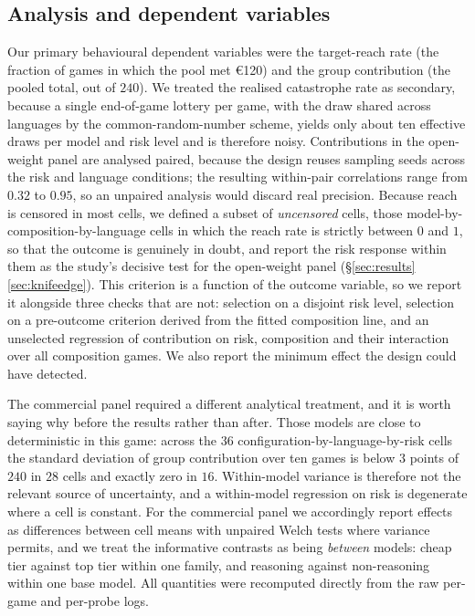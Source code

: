 \documentclass[openacc]{rsproca_new}
\begin{document}
\subsection{Analysis and dependent variables}
Our primary behavioural dependent variables were the target-reach rate (the fraction of games in which the pool met \euro{}120) and the group contribution (the pooled total, out of $240$). We treated the realised catastrophe rate as secondary, because a single end-of-game lottery per game, with the draw shared across languages by the common-random-number scheme, yields only about ten effective draws per model and risk level and is therefore noisy. Contributions in the open-weight panel are analysed paired, because the design reuses sampling seeds across the risk and language conditions; the resulting within-pair correlations range from $0.32$ to $0.95$, so an unpaired analysis would discard real precision. Because reach is censored in most cells, we defined a subset of \emph{uncensored} cells, those model-by-composition-by-language cells in which the reach rate is strictly between $0$ and $1$, so that the outcome is genuinely in doubt, and report the risk response within them as the study's decisive test for the open-weight panel (\S\ref{sec:results}\ref{sec:knifeedge}). This criterion is a function of the outcome variable, so we report it alongside three checks that are not: selection on a disjoint risk level, selection on a pre-outcome criterion derived from the fitted composition line, and an unselected regression of contribution on risk, composition and their interaction over all composition games. We also report the minimum effect the design could have detected.

The commercial panel required a different analytical treatment, and it is worth saying why before the results rather than after. Those models are close to deterministic in this game: across the $36$ configuration-by-language-by-risk cells the standard deviation of group contribution over ten games is below $3$ points of $240$ in $28$ cells and exactly zero in $16$. Within-model variance is therefore not the relevant source of uncertainty, and a within-model regression on risk is degenerate where a cell is constant. For the commercial panel we accordingly report effects as differences between cell means with unpaired Welch tests where variance permits, and we treat the informative contrasts as being \emph{between} models: cheap tier against top tier within one family, and reasoning against non-reasoning within one base model. All quantities were recomputed directly from the raw per-game and per-probe logs.
\end{document}
